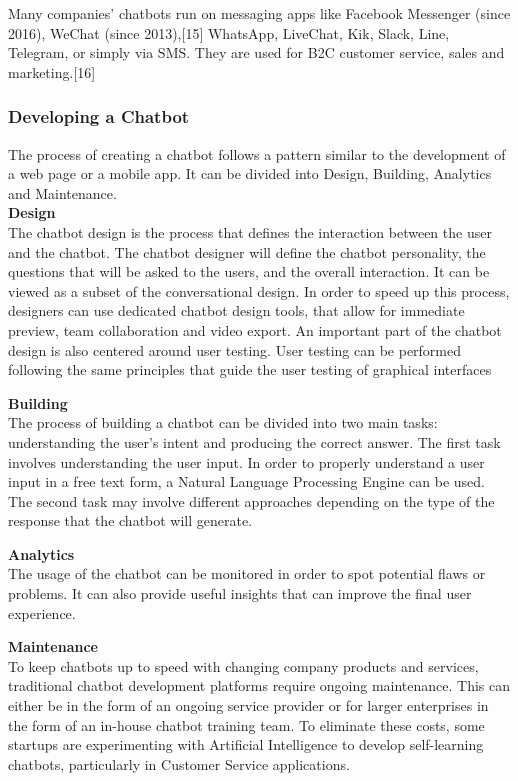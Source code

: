 Many companies' chatbots run on messaging apps like Facebook Messenger (since 2016), WeChat (since 2013),[15] WhatsApp, LiveChat, Kik, Slack, Line, Telegram, or simply via SMS. They are used for B2C customer service, sales and marketing.[16]

\subsubsection{Developing a Chatbot}
The process of creating a chatbot follows a pattern similar to the development of a web page or a mobile app. It can be divided into Design, Building, Analytics and Maintenance.\\

{\bf Design}\\
The chatbot design is the process that defines the interaction between the user and the chatbot. The chatbot designer will define the chatbot personality, the questions that will be asked to the users, and the overall interaction. It can be viewed as a subset of the conversational design. In order to speed up this process, designers can use dedicated chatbot design tools, that allow for immediate preview, team collaboration and video export. An important part of the chatbot design is also centered around user testing. User testing can be performed following the same principles that guide the user testing of graphical interfaces

{\bf Building}\\
The process of building a chatbot can be divided into two main tasks: understanding the user's intent and producing the correct answer. The first task involves understanding the user input. In order to properly understand a user input in a free text form, a Natural Language Processing Engine can be used. The second task may involve different approaches depending on the type of the response that the chatbot will generate.

{\bf Analytics}\\
The usage of the chatbot can be monitored in order to spot potential flaws or problems. It can also provide useful insights that can improve the final user experience.

{\bf Maintenance}\\
To keep chatbots up to speed with changing company products and services, traditional chatbot development platforms require ongoing maintenance. This can either be in the form of an ongoing service provider or for larger enterprises in the form of an in-house chatbot training team. To eliminate these costs, some startups are experimenting with Artificial Intelligence to develop self-learning chatbots, particularly in Customer Service applications.

